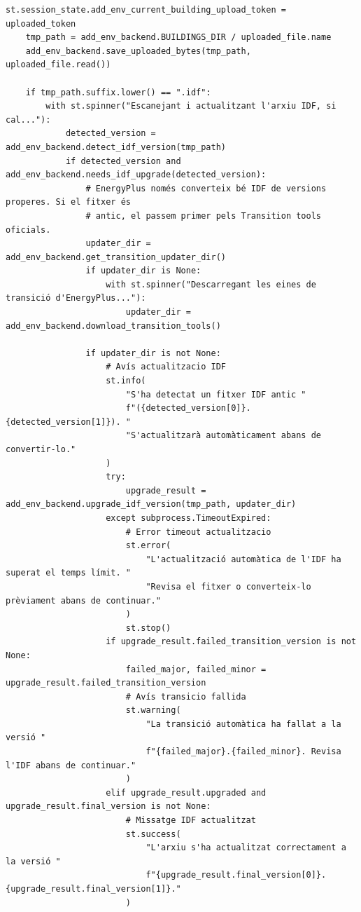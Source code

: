 \documentclass[10pt,a4paper]{article}
\begin{document}
\begin{lstlisting}[style=studioPython,caption={pages/Afegir\_Entorn.py},label={lst:pages-afegir-entorn-py}]
    st.session_state.add_env_current_building_upload_token = uploaded_token
    tmp_path = add_env_backend.BUILDINGS_DIR / uploaded_file.name
    add_env_backend.save_uploaded_bytes(tmp_path, uploaded_file.read())

    if tmp_path.suffix.lower() == ".idf":
        with st.spinner("Escanejant i actualitzant l'arxiu IDF, si cal..."):
            detected_version = add_env_backend.detect_idf_version(tmp_path)
            if detected_version and add_env_backend.needs_idf_upgrade(detected_version):
                # EnergyPlus només converteix bé IDF de versions properes. Si el fitxer és
                # antic, el passem primer pels Transition tools oficials.
                updater_dir = add_env_backend.get_transition_updater_dir()
                if updater_dir is None:
                    with st.spinner("Descarregant les eines de transició d'EnergyPlus..."):
                        updater_dir = add_env_backend.download_transition_tools()

                if updater_dir is not None:
                    # Avís actualitzacio IDF
                    st.info(
                        "S'ha detectat un fitxer IDF antic "
                        f"({detected_version[0]}.{detected_version[1]}). "
                        "S'actualitzarà automàticament abans de convertir-lo."
                    )
                    try:
                        upgrade_result = add_env_backend.upgrade_idf_version(tmp_path, updater_dir)
                    except subprocess.TimeoutExpired:
                        # Error timeout actualitzacio
                        st.error(
                            "L'actualització automàtica de l'IDF ha superat el temps límit. "
                            "Revisa el fitxer o converteix-lo prèviament abans de continuar."
                        )
                        st.stop()
                    if upgrade_result.failed_transition_version is not None:
                        failed_major, failed_minor = upgrade_result.failed_transition_version
                        # Avís transicio fallida
                        st.warning(
                            "La transició automàtica ha fallat a la versió "
                            f"{failed_major}.{failed_minor}. Revisa l'IDF abans de continuar."
                        )
                    elif upgrade_result.upgraded and upgrade_result.final_version is not None:
                        # Missatge IDF actualitzat
                        st.success(
                            "L'arxiu s'ha actualitzat correctament a la versió "
                            f"{upgrade_result.final_version[0]}.{upgrade_result.final_version[1]}."
                        )


\end{lstlisting}
\end{document}
